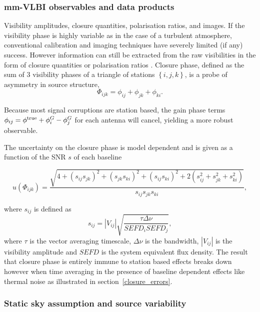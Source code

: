 \subsubsection{mm-VLBI observables and data products}
Visibility amplitudes, closure quantities, polarisation ratios, and images.
If the visibility phase is highly variable as in the case of a turbulent atmosphere,  conventional calibration and imaging techniques have severely limited (if any) success. However information can still be extracted from the raw visibilities in the form of closure quantities \citep{Monnier_2007} or polarisation ratios \citep{Fish_2009}. Closure phase, defined as the sum of 3 visibility phases of a triangle of stations $\left\{i,j,k\right\}$, is a probe of asymmetry in source structure,
\begin{equation}
\Phi_{ijk} = \phi_{ij}+\phi_{jk}+\phi_{ki}.
\end{equation}

\noindent Because most signal corruptions are station based, the gain phase terms $\phi_{ij}=\phi^{\rm true}+ \phi^G_i -\phi^G_j$ for each antenna will cancel, yielding a more robust observable. 

The uncertainty on the closure phase is model dependent \citep{Rogers_1995} and is given as a function of the SNR $s$ of each baseline 

\begin{equation}\label{eq:ucp}
u(\Phi_{ijk}) = \frac{\sqrt{4 + (s_{ij}s_{jk})^2 + (s_{jk}s_{ki})^2 + (s_{ij}s_{ki})^2 +
                        2(s_{ij}^2+s_{jk}^2+s_{ki}^2)}}{s_{ij}s_{jk}s_{ki}},
\end{equation}

\noindent where $s_{ij}$ is defined as
\begin{equation}
s_{ij}=|V_{ij}| \sqrt{\frac{ \tau \Delta \nu}{SEFD_i SEFD_j}},
\end{equation}
where $\tau$ is the vector averaging timescale, $\Delta \nu$ is the bandwidth, $|V_{ij}|$ is the visibility amplitude and $SEFD$ is the system equivalent flux density. The result that closure phase is entirely immune to station based effects breaks down however when time averaging in the presence of baseline dependent effects like thermal noise as illustrated in section~\ref{closure_errors}.
 
 \subsubsection{Static sky assumption and source variability}

